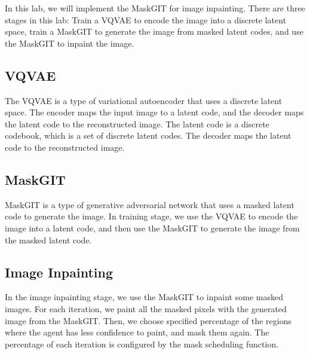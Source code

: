 In this lab, we will implement the MaskGIT for image inpainting.
There are three stages in this lab: Train a VQVAE to encode the image into a discrete latent space, train a MaskGIT to generate the image from masked latent codes, and use the MaskGIT to inpaint the image.

\subsection{VQVAE}
    The VQVAE is a type of variational autoencoder that uses a discrete latent space.
    The encoder maps the input image to a latent code, and the decoder maps the latent code to the reconstructed image.
    The latent code is a discrete codebook, which is a set of discrete latent codes.
    The decoder maps the latent code to the reconstructed image.

\subsection{MaskGIT}
    MaskGIT is a type of generative adversarial network that uses a masked latent code to generate the image.
    In training stage, we use the VQVAE to encode the image into a latent code, and then use the MaskGIT to generate the image from the masked latent code.

\subsection{Image Inpainting}
    In the image inpainting stage, we use the MaskGIT to inpaint some masked images.
    For each iteration, we paint all the masked pixels with the generated image from the MaskGIT.
    Then, we choose specified percentage of the regions where the agent has less confidence to paint, and mask them again.
    The percentage of each iteration is configured by the mask scheduling function.